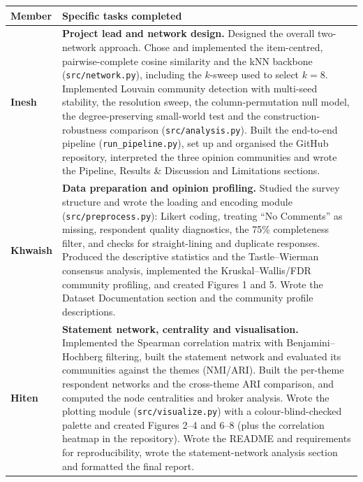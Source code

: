\documentclass[11pt,a4paper]{article}
\begin{document}
\begin{table}[h]
\centering\small
\begin{tabularx}{\linewidth}{@{}p{2.3cm}X@{}}
\toprule
\textbf{Member} & \textbf{Specific tasks completed}\\
\midrule
\textbf{Inesh} &
\textbf{Project lead and network design.} Designed the overall two-network approach. Chose and implemented the
item-centred, pairwise-complete cosine similarity and the kNN backbone (\texttt{src/network.py}), including the
$k$-sweep used to select $k=8$. Implemented Louvain community detection with multi-seed stability, the resolution
sweep, the column-permutation null model, the degree-preserving small-world test and the construction-robustness
comparison (\texttt{src/analysis.py}). Built the end-to-end pipeline (\texttt{run\_pipeline.py}), set up and organised the
GitHub repository, interpreted the three opinion communities and wrote the Pipeline, Results \& Discussion and
Limitations sections.\\
\midrule
\textbf{Khwaish} &
\textbf{Data preparation and opinion profiling.} Studied the survey structure and wrote the loading and encoding
module (\texttt{src/preprocess.py}): Likert coding, treating ``No Comments'' as missing, respondent quality
diagnostics, the 75\% completeness filter, and checks for straight-lining and duplicate responses. Produced the
descriptive statistics and the Tastle--Wierman consensus analysis, implemented the Kruskal--Wallis/FDR community
profiling, and created Figures 1 and 5. Wrote the Dataset Documentation section and the community profile descriptions.\\
\midrule
\textbf{Hiten} &
\textbf{Statement network, centrality and visualisation.} Implemented the Spearman correlation matrix with
Benjamini--Hochberg filtering, built the statement network and evaluated its communities against the themes (NMI/ARI).
Built the per-theme respondent networks and the cross-theme ARI comparison, and computed the node centralities and
broker analysis. Wrote the plotting module (\texttt{src/visualize.py}) with a colour-blind-checked palette and created
Figures 2--4 and 6--8 (plus the correlation heatmap in the repository). Wrote the README and requirements for reproducibility, wrote the statement-network analysis
section and formatted the final report.\\
\bottomrule
\end{tabularx}
\end{table}
\end{document}
